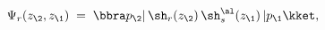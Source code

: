 \begin{equation}\label{psidef}
\Psi_r(z_\2,z_\1)\;=\;\bbra p_\2|\,\sh_r(z_\2)\,\sh_s^{\al}(z_\1)\,
|p_\1\kket,
\end{equation}


